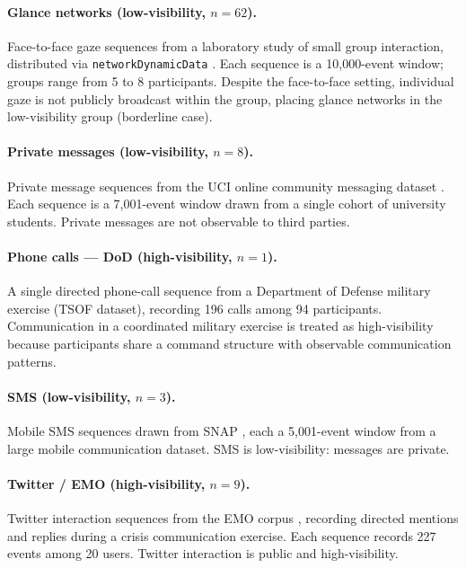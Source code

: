\documentclass[11pt]{article}
\begin{document}
\paragraph{Glance networks (low-visibility, $n = 62$).}
Face-to-face gaze sequences from a laboratory study of small group interaction, distributed via \texttt{networkDynamicData} \citep{bender2016package}. Each sequence is a 10,000-event window; groups range from 5 to 8 participants. Despite the face-to-face setting, individual gaze is not publicly broadcast within the group, placing glance networks in the low-visibility group (borderline case).

\paragraph{Private messages (low-visibility, $n = 8$).}
Private message sequences from the UCI online community messaging dataset \citep{panzarasa2009patterns}. Each sequence is a 7,001-event window drawn from a single cohort of university students. Private messages are not observable to third parties.

\paragraph{Phone calls --- DoD (high-visibility, $n = 1$).}
A single directed phone-call sequence from a Department of Defense military exercise (TSOF dataset), recording 196 calls among 94 participants. Communication in a coordinated military exercise is treated as high-visibility because participants share a command structure with observable communication patterns.

\paragraph{SMS (low-visibility, $n = 3$).}
Mobile SMS sequences drawn from SNAP \citep{snapnets}, each a 5,001-event window from a large mobile communication dataset. SMS is low-visibility: messages are private.

\paragraph{Twitter / EMO (high-visibility, $n = 9$).}
Twitter interaction sequences from the EMO corpus \citep{renshaw2023modeling}, recording directed mentions and replies during a crisis communication exercise. Each sequence records 227 events among 20 users. Twitter interaction is public and high-visibility.
\end{document}
